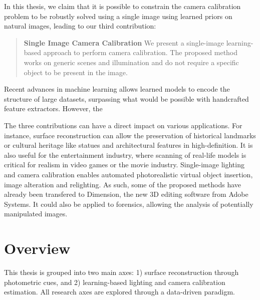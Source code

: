 In this thesis, we claim that it is possible to constrain the camera calibration problem to be robustly solved using a single image using learned priors on natural images, leading to our third contribution: 

\begin{quotation}
\textbf{Single Image Camera Calibration} We present a single-image learning-based approach to perform camera calibration. The proposed method works on generic scenes and illumination and do not require a specific object to be present in the image. 
\end{quotation}

Recent advances in machine learning allows learned models to encode the structure of large datasets, surpassing what would be possible with handcrafted feature extractors. However, the 


The three contributions can have a direct impact on various applications. For instance, surface reconstruction can allow the preservation of historical landmarks or cultural heritage like statues and architectural features in high-definition. It is also useful for the entertainment industry, where scanning of real-life models is critical for realism in video games or the movie industry. Single-image lighting and camera calibration enables automated photorealistic virtual object insertion, image alteration and relighting. As such, some of the proposed methods have already been transfered to Dimension, the new 3D editing software from Adobe Systems. It could also be applied to forensics, allowing the analysis of potentially manipulated images. 

\section*{Overview}

This thesis is grouped into two main axes: 1) surface reconstruction through photometric cues, and 2) learning-based lighting and camera calibration estimation. All research axes are explored through a data-driven paradigm. 

